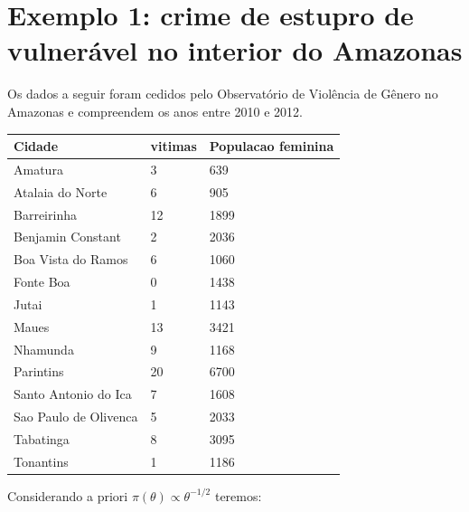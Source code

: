 \documentclass[
  letterpaper,
  DIV=11,
  numbers=noendperiod]{scrreprt}
\theoremstyle{definition}
\theoremstyle{definition}
\theoremstyle{plain}
\theoremstyle{remark}
\begin{document}
\section{Exemplo 1: crime de estupro de vulnerável no interior do
Amazonas}\label{exemplo-1-crime-de-estupro-de-vulneruxe1vel-no-interior-do-amazonas-1}

Os dados a seguir foram cedidos pelo Observatório de Violência de Gênero
no Amazonas e compreendem os anos entre 2010 e 2012.

\begin{longtable}[]{@{}lll@{}}
\toprule\noalign{}
Cidade & vitimas & Populacao feminina \\
\midrule\noalign{}
\endhead
\bottomrule\noalign{}
\endlastfoot
Amatura & 3 & 639 \\
Atalaia do Norte & 6 & 905 \\
Barreirinha & 12 & 1899 \\
Benjamin Constant & 2 & 2036 \\
Boa Vista do Ramos & 6 & 1060 \\
Fonte Boa & 0 & 1438 \\
Jutai & 1 & 1143 \\
Maues & 13 & 3421 \\
Nhamunda & 9 & 1168 \\
Parintins & 20 & 6700 \\
Santo Antonio do Ica & 7 & 1608 \\
Sao Paulo de Olivenca & 5 & 2033 \\
Tabatinga & 8 & 3095 \\
Tonantins & 1 & 1186 \\
\end{longtable}

Considerando a priori \(\pi(\theta)\varpropto \theta^{-1/2}\) teremos:
\end{document}
